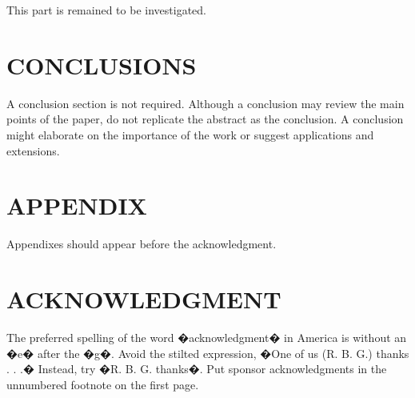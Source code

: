 \documentclass[letterpaper, 10 pt, conference]{ieeeconf}  %
\begin{document}
This part is remained to be investigated. 

\section{CONCLUSIONS}

A conclusion section is not required. Although a conclusion may review the main points of the paper, do not replicate the abstract as the conclusion. A conclusion might elaborate on the importance of the work or suggest applications and extensions. 








\section*{APPENDIX}

Appendixes should appear before the acknowledgment.

\section*{ACKNOWLEDGMENT}

The preferred spelling of the word �acknowledgment� in America is without an �e� after the �g�. Avoid the stilted expression, �One of us (R. B. G.) thanks . . .�  Instead, try �R. B. G. thanks�. Put sponsor acknowledgments in the unnumbered footnote on the first page.






\end{document}
